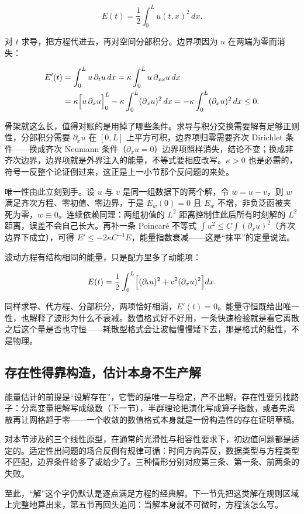 \[
E(t)=\frac12\int_0^L u(t,x)^2\,dx .
\]

对 \(t\) 求导，把方程代进去，再对空间分部积分。边界项因为 \(u\) 在两端为零而消失：

\[
\begin{aligned}
E'(t)&=\int_0^L u\,\partial_tu\,dx
=\kappa\int_0^L u\,\partial_{xx}u\,dx\\
&=\kappa\Bigl[u\,\partial_xu\Bigr]_0^L-\kappa\int_0^L(\partial_xu)^2\,dx
=-\kappa\int_0^L(\partial_xu)^2\,dx\le0 .
\end{aligned}
\]

骨架就这么长，值得对账的是用掉了哪些条件。求导与积分交换需要解有足够正则性，分部积分需要 \(\partial_xu\) 在 \([0,L]\) 上平方可积，边界项归零需要齐次 Dirichlet 条件——换成齐次 Neumann 条件（\(\partial_xu=0\)）边界项照样消失，结论不变；换成非齐次边界，边界项就是外界注入的能量，不等式要相应改写。\(\kappa>0\) 也是必需的，符号一反整个论证倒过来，这正是上一小节那个反问题的来处。

唯一性由此立刻到手。设 \(u\) 与 \(v\) 是同一组数据下的两个解，令 \(w=u-v\)，则 \(w\) 满足齐次方程、零初值、零边界，于是 \(E_w(0)=0\) 且 \(E_w\) 不增，非负泛函被夹死为零，\(w\equiv0\)。连续依赖同理：两组初值的 \(L^2\) 距离控制住此后所有时刻解的 \(L^2\) 距离，误差不会自己长大。再补一条 Poincaré 不等式 \(\int u^2\le C\int(\partial_xu)^2\)（齐次边界下成立），可得 \(E'\le-2\kappa C^{-1}E\)，能量指数衰减——这是``抹平''的定量说法。

波动方程有结构相同的能量，只是配方里多了动能项：

\[
E(t)=\frac12\int_0^L\Bigl[(\partial_tu)^2+c^2(\partial_xu)^2\Bigr]dx .
\]

同样求导、代方程、分部积分，两项恰好相消，\(E'(t)=0\)。能量守恒既给出唯一性，也解释了波形为什么不衰减。数值格式好不好用，一条快速检验就是看它离散之后这个量是否也守恒——耗散型格式会让波幅慢慢矮下去，那是格式的黏性，不是物理。

\subsection{存在性得靠构造，估计本身不生产解}

能量估计的前提是``设解存在''，它管的是唯一与稳定，产不出解。存在性要另找路子：分离变量把解写成级数（下一节），半群理论把演化写成算子指数，或者先离散再让网格趋于零——一个收敛的数值格式本身就是一份构造性的存在证明草稿。

对本节涉及的三个线性原型，在通常的光滑性与相容性要求下，初边值问题都是适定的。适定性出问题的场合反倒有规律可循：时间方向弄反，数据类型与方程类型不匹配，边界条件给多了或给少了。三种情形分别对应第三条、第一条、前两条的失败。

至此，``解''这个字仍默认是逐点满足方程的经典解。下一节先把这类解在规则区域上完整地算出来，第五节再回头追问：当解本身就不可微时，方程该怎么写。
